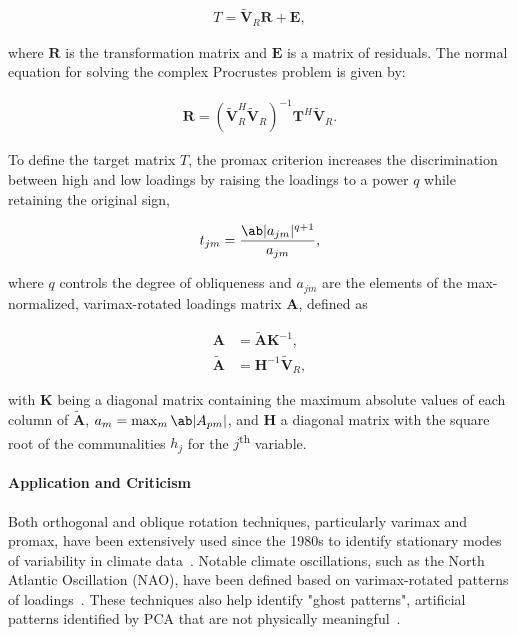 \begin{align}\label{eq:theory:procrustes}
    T = \tilde{\bm{V}}_R \bm{R} + \bm{E},
\end{align}

where $\bm{R}$ is the transformation matrix and $\bm{E}$ is a matrix of residuals. The normal equation for solving the complex Procrustes problem is given by:

\begin{align}
    \bm{R} = (\tilde{\bm{V}}_R^H \tilde{\bm{V}}_R)^{-1} \bm{T}^H \tilde{\bm{V}}_R.
\end{align}

To define the target matrix $T$, the promax criterion increases the discrimination between high and low loadings by raising the loadings to a power $q$ while retaining the original sign,

\begin{align}
    t_{jm} = \frac{\ab|a_{jm}|^{q+1}}{a_{jm}},
\end{align}

where $q$ controls the degree of obliqueness and $a_{jm}$ are the elements of the max-normalized, varimax-rotated loadings matrix $\bm{A}$, defined as 

\begin{align}
    \bm{A} &= \tilde{\bm{A}} \bm{K}^{-1}, \\
    \tilde{\bm{A}} &= \bm{H}^{-1}\tilde{\bm{V}}_R,
\end{align}

with $\bm{K}$ being a diagonal matrix containing the maximum absolute values of each column of $\tilde{\bm{A}}$, $a_{m} = \max_{m} \ab|A_{pm}|$, and $\bm{H}$ a diagonal matrix with the square root of the communalities $h_j$ for the $j$\textsuperscript{th} variable.

\paragraph{Application and Criticism} Both orthogonal and oblique rotation techniques, particularly varimax and promax, have been extensively used since the 1980s to identify stationary modes of variability in climate data~\cite[e.g.][]{horel_rotated_1981,barnston_classification_1987,lim_east_2015,gao_impacts_2017,mezzina_dynamics_2020,huth_how_2021,lee_quantifying_2019}. Notable climate oscillations, such as the North Atlantic Oscillation (NAO),
have been defined based on varimax-rotated patterns of loadings~\cite{barnston_classification_1987}. These techniques also help identify "ghost patterns", artificial patterns identified by PCA that are not physically meaningful~\cite{lian_evaluation_2012,huth_how_2021}.

